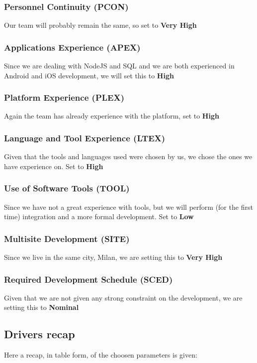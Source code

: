 \subsubsection{Personnel Continuity (PCON)}
Our team will probably remain the same, so set to \textbf{Very High}
\subsubsection{Applications Experience (APEX)}
Since we are dealing with NodeJS and SQL and we are both experienced in Android and iOS development, we will set this to \textbf{High}
\subsubsection{Platform Experience (PLEX)}
Again the team has already experience with the platform, set to \textbf{High}
\subsubsection{Language and Tool Experience (LTEX)}
Given that the tools and languages used were chosen by us, we chose the ones we have experience on. Set to \textbf{High}
\subsubsection{Use of Software Tools (TOOL)}
Since we have not a great experience with tools, but we will perform (for the first time) integration and a more formal development. Set to \textbf{Low}
\subsubsection{Multisite Development (SITE)}
Since we live in the same city, Milan, we are setting this to \textbf{Very High}
\subsubsection{Required Development Schedule (SCED)}
Given that we are not given any strong constraint on the development, we are setting this to \textbf{Nominal}
\clearpage
\subsection{Drivers recap}
Here a recap, in table form, of the choosen parameters is given: 

